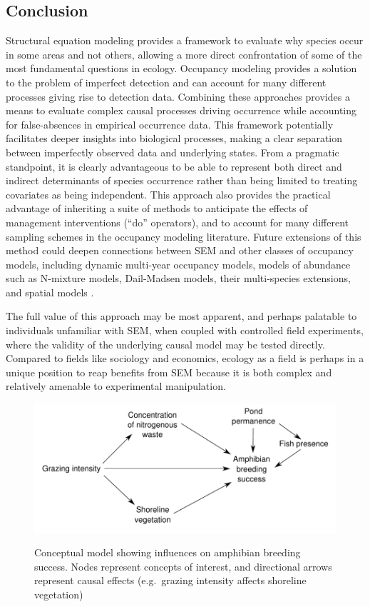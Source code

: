 \subsection{Conclusion}

Structural equation modeling provides a framework to evaluate why
species occur in some areas and not others, allowing a more direct
confrontation of some of the most fundamental questions in ecology.
Occupancy modeling provides a solution to the problem of imperfect
detection and can account for many different processes giving rise to
detection data. Combining these approaches provides a means to evaluate
complex causal processes driving occurrence while accounting for
false-absences in empirical occurrence data. This framework potentially
facilitates deeper insights into biological processes, making a clear
separation between imperfectly observed data and underlying states. From
a pragmatic standpoint, it is clearly advantageous to be able to
represent both direct and indirect determinants of species occurrence
rather than being limited to treating covariates as being independent.
This approach also provides the practical advantage of inheriting a
suite of methods to anticipate the effects of management interventions
(``do'' operators), and to account for many different sampling schemes
in the occupancy modeling literature. Future extensions of this method
could deepen connections between SEM and other classes of occupancy
models, including dynamic multi-year occupancy models, models of
abundance such as N-mixture models, Dail-Madsen models, their
multi-species extensions, and spatial models \citep{Royle2004, Royle2007, Dail2011, Lamb2014, Dorazio2014}.

The full value of this approach may be most apparent, and perhaps
palatable to individuals unfamiliar with SEM, when coupled with
controlled field experiments, where the validity of the underlying
causal model may be tested directly. Compared to fields like sociology
and economics, ecology as a field is perhaps in a unique position to
reap benefits from SEM because it is both complex and relatively
amenable to experimental manipulation.

\begin{figure}[htbp]
\caption[Conceptual model showing influences on amphibian breeding success.]{
Conceptual model showing influences on amphibian breeding success. Nodes
represent concepts of interest, and directional arrows represent causal
effects (e.g.~grazing intensity affects shoreline vegetation)
}
\centering
\includegraphics[width=150mm]{figs/ch3/fig1.pdf}
\label{3-1}
\end{figure}

